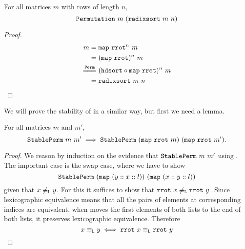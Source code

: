 \documentclass[sigplan,10pt,anonymous,review]{thesis}
\begin{document}
\begin{theorem}
  For all matrices $m$ with rows of length $n$,
  \begin{equation*}
    \texttt{Permutation}~m~(\texttt{radixsort}~m~n)
  \end{equation*}
\end{theorem}
\begin{proof}
  \begin{align*}
    m ={}&
    \var{map}~\var{rrot}^n~m \\
    ={}& (\var{map}~\var{rrot})^n~m \\
    \eqperm{}& (\var{hdsort} \comp \var{map}~\var{rrot})^n~m \\
    ={}& \var{radixsort}~m~n \qedhere
  \end{align*}
\end{proof}

We will prove the stability of  in a similar way, but
first we need a lemma.
\begin{lemma}
  For all matrices $m$ and $m'$,
  \begin{equation*}
    \texttt{StablePerm}~m~m' \implies
    \texttt{StablePerm}~(\texttt{map}~\texttt{rrot}~m)~(\texttt{map}~\texttt{rrot}~m').
  \end{equation*}
\end{lemma}
\begin{proof}
  We reason by induction on the evidence that $\texttt{StablePerm}~m~m'$
  using . The important case is the swap case,
  where we have to show
  \begin{equation*}
    \texttt{StablePerm}~(\texttt{map}~(y :: x :: l))~(\texttt{map}~(x :: y :: l))
  \end{equation*}
  given that $x \not\equiv_{\texttt{L}} y$. For this it suffices to show that
  $\texttt{rrot}~x \not\equiv_{\texttt{L}} \texttt{rrot}~y$. Since lexicographic
  equivalence means that all the pairs of elements at corresponding
  indices are equivalent, when  moves the first elements of
  both lists to the end of both lists, it preserves lexicographic
  equivalence. Therefore
  \begin{equation*}
    x \equiv_{\texttt{L}} y \iff \texttt{rrot}~x \equiv_{\texttt{L}} \texttt{rrot}~y \qedhere
  \end{equation*}
\end{proof}
\end{document}
